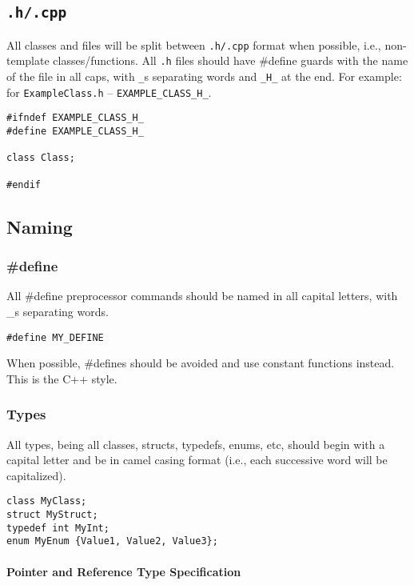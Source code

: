 \documentclass[12pt]{article}
\begin{document}
\subsection{\texttt{.h/.cpp}}
All classes and files will be split between \texttt{.h/.cpp} format when
possible, i.e., non-template classes/functions. All \texttt{.h} files should
have \#define guards with the name of the file in all caps, with \texttt{\_}s
separating words and \texttt{\_H\_} at the end. For example: for
\texttt{ExampleClass.h} -- \texttt{EXAMPLE\_CLASS\_H\_}.

\begin{lstlisting}
#ifndef EXAMPLE_CLASS_H_
#define EXAMPLE_CLASS_H_

class Class;

#endif
\end{lstlisting}

\subsection{Naming}

\subsubsection{\#define}
All \#define preprocessor commands should be named in all capital letters, with
\_s separating words.

\begin{lstlisting}
#define MY_DEFINE
\end{lstlisting}

When possible, \#defines should be avoided and use constant functions instead.
This is the C++ style.

\subsubsection{Types}
All types, being all classes, structs, typedefs, enums, etc, should begin
with a capital letter and be in camel casing format (i.e., each successive word
will be capitalized).

\begin{lstlisting}[mathescape]
class MyClass;
struct MyStruct;
typedef int MyInt;
enum MyEnum {Value1, Value2, Value3};
\end{lstlisting}

\paragraph{Pointer and Reference Type Specification}
\end{document}
